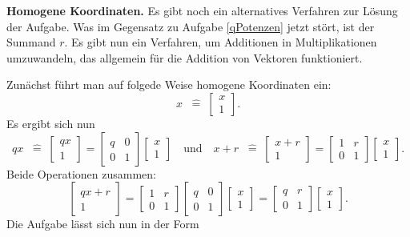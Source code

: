 \documentclass[a4paper,10pt,fleqn,twoside]{scrartcl}
\numberwithin{equation}{section}
\newcommand{\strong}[1]{{\normalfont\sffamily\bfseries #1}}
\newcommand{\entspricht}{\;\;\hat =\;}
\theoremstyle{Aufgabe}
\begin{document}
\strong{Homogene Koordinaten.}
Es gibt noch ein alternatives Verfahren zur Lösung der Aufgabe.
Was im Gegensatz zu Aufgabe \ref{qPotenzen}
jetzt stört, ist der Summand $r$. Es gibt nun ein Verfahren, um
Additionen in Multiplikationen umzuwandeln, das allgemein für die
Addition von Vektoren funktioniert.

Zunächst führt man auf folgede Weise homogene Koordinaten ein:
\[ x\entspricht\begin{bmatrix}x\\ 1\end{bmatrix}.\]
Es ergibt sich nun
\[ qx\entspricht\begin{bmatrix}qx\\ 1\end{bmatrix}
= \begin{bmatrix}
q & 0\\
0 & 1
\end{bmatrix}
\begin{bmatrix}x\\ 1\end{bmatrix}
\quad\text{und}\quad
x+r\entspricht\begin{bmatrix}x+r\\ 1\end{bmatrix}
= \begin{bmatrix}
1 & r\\
0 & 1
\end{bmatrix}
\begin{bmatrix}x\\ 1\end{bmatrix}.\]
Beide Operationen zusammen:
\[\begin{bmatrix}qx+r\\ 1\end{bmatrix}
= \begin{bmatrix}
1 & r\\
0 & 1
\end{bmatrix}
\begin{bmatrix}
q & 0\\
0 & 1
\end{bmatrix}
\begin{bmatrix}x\\ 1\end{bmatrix}
= \begin{bmatrix}
q & r\\
0 & 1
\end{bmatrix}
\begin{bmatrix}x\\ 1\end{bmatrix}.\]
Die Aufgabe lässt sich nun in der Form
\end{document}
